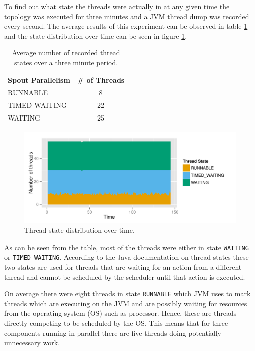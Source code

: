 \documentclass[bsc,logo,frontabs,twoside,singlespacing,normalheadings,parskip]{infthesis}\usepackage[]{graphicx}\usepackage[]{color}
\makeatletter
\def\maxwidth{ %
  \ifdim\Gin@nat@width>\linewidth
    \linewidth
  \else
    \Gin@nat@width
  \fi
}
\newenvironment{knitrout}{}{} %
\makeatother
\begin{document}
To find out what state the threads were actually in at any given time the topology was executed for three minutes and a JVM thread dump was recorded every second. The average results of this experiment can be observed in table \ref{table:dump} and the state distribution over time can be seen in figure \ref{fig:dump-plot}.

\begin{table}[h!]
\centering
\begin{tabular}{@{}lc@{}}
    \textbf{Spout Parallelism} & \textbf{\# of Threads} \\ \toprule
    RUNNABLE & 8  \\
	TIMED WAITING & 22  \\
    WAITING & 25  \\
\end{tabular}
\caption{Average number of recorded thread states over a three minute period.}
\label{table:dump}
\end{table}

\begin{knitrout}
\color{fgcolor}\begin{figure}
\includegraphics[width=\maxwidth]{figure/dump-plot-1} \caption[Thread state distribution over time]{Thread state distribution over time.}\label{fig:dump-plot}
\end{figure}


\end{knitrout}

As can be seen from the table, most of the threads were either in state \texttt{WAITING} or \texttt{TIMED WAITING}. According to the Java documentation on thread states \cite{JavaThreads} these two states are used for threads that are waiting for an action from a different thread and cannot be scheduled by the scheduler until that action is executed.

On average there were eight threads in state \texttt{RUNNABLE} which JVM uses to mark threads which are executing on the JVM and are possibly waiting for resources from the operating system (OS) such as processor. Hence, these are threads directly competing to be scheduled by the OS. This means that for three components running in parallel there are five threads doing potentially unnecessary work.
\end{document}
